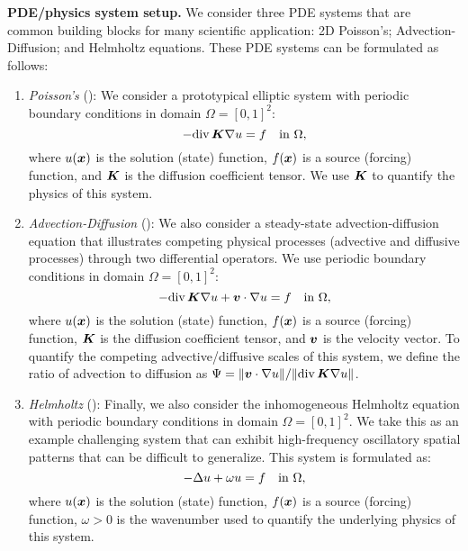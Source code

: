 \medskip
\noindent \textbf{PDE/physics system setup.}
We consider three PDE systems that are common building blocks for many scientific application: 2D Poisson's; Advection-Diffusion; and Helmholtz equations. 
These PDE systems can be formulated as follows:
\begin{enumerate}[leftmargin=5ex, nosep]
    \item
    \textit{Poisson's} (\sysA{}): We consider a prototypical elliptic system with periodic boundary conditions in domain $\Omega = [0, 1]^2$:
    \begin{equation}
       - \mbox{div}\, \boldsymbol{K} \nabla u = f \quad \text{in} \ \Omega, \label{eq:poisson}
    \end{equation}
    where $u(\boldsymbol{x})$ is the solution (state) function,  $f(\boldsymbol{x})$ is a source (forcing) function, and $\boldsymbol{K}$ is the diffusion coefficient tensor. We use $\boldsymbol{K}$ to quantify the physics of this system.
    \item \textit{Advection-Diffusion} (\sysB{}): We also consider a steady-state advection-diffusion equation that illustrates competing physical processes (advective and diffusive processes) through two differential operators. We use periodic boundary conditions in domain $\Omega = [0, 1]^2$: 
    \begin{equation}
       - \mbox{div}\, \boldsymbol{K} \nabla u + \boldsymbol{v} \cdot \nabla u = f \quad \text{in} \ \Omega, \label{eq:ad}
    \end{equation}
    where $u(\boldsymbol{x})$ is the solution (state) function,  $f(\boldsymbol{x})$ is a source (forcing) function, $\boldsymbol{K}$ is the diffusion coefficient tensor, and $\boldsymbol{v}$ is the velocity vector. 
    To quantify the competing advective/diffusive scales of this system, we define the ratio of advection to diffusion as $\Psi = \|\boldsymbol{v} \cdot \nabla u \|/\| \mbox{div}\, \boldsymbol{K} \nabla u \|$.
    \item \textit{Helmholtz} (\sysC{}): Finally, we also consider the inhomogeneous Helmholtz equation with periodic boundary conditions in domain $\Omega = [0, 1]^2$. We take this as an example challenging system that can exhibit high-frequency oscillatory spatial patterns that can be difficult to generalize. 
    This system is formulated as:
    \begin{equation}
       - \ilap u + \omega u = f \quad \text{in} \ \Omega, \label{eq:helm}
    \end{equation}
    where $u(\boldsymbol{x})$ is the solution (state) function,  $f(\boldsymbol{x})$ is a source (forcing) function, $\omega > 0 $ is the wavenumber used to quantify the underlying physics of this system.
\end{enumerate}

